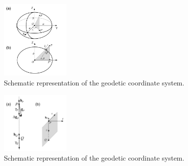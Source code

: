 \documentclass[paper,twocolumn,twoside]{geophysics}
\begin{document}

\begin{figure}
    \centering
    \includegraphics[width=0.3\textwidth]{figures/geodetic_coordinates.png}
    \caption{Schematic representation of the geodetic coordinate
    system.}
  \label{fig:fig1}
\end{figure}

\begin{figure}
    \centering
    \includegraphics[width=0.3\textwidth]{figures/gravitational_disturbance.png}
    \caption{Schematic representation of the geodetic coordinate
    system.}
  \label{fig:fig2}
\end{figure}
\end{document}
